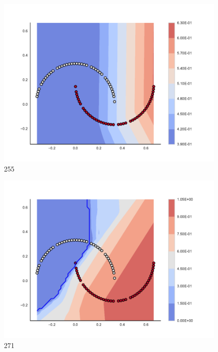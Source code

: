 \begin{subfigure}[b]{0.09\textwidth}
    \includegraphics[width=\textwidth]{img/convergence/255.pdf}
    \caption{255}
    \label{fig:convergence_255}
\end{subfigure}
%
\begin{subfigure}[b]{0.09\textwidth}
    \includegraphics[width=\textwidth]{img/convergence/271.pdf}
    \caption{271}
    \label{fig:convergence_271}
\end{subfigure}
%
